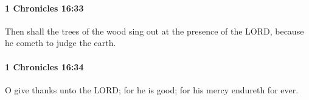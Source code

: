 		\paragraph{1 Chronicles 16:33} %
			\label{1CHRONICLES-16-33}

			Then shall the trees of the wood sing out at the presence of the LORD, because he cometh to judge the earth.


		\paragraph{1 Chronicles 16:34} %
			\label{1CHRONICLES-16-34}

			O give thanks unto the LORD; for he is good; for his mercy endureth for ever.


